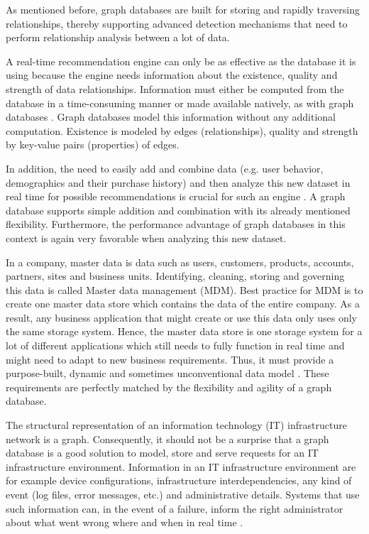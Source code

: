 As mentioned before, graph databases are built for storing and rapidly traversing relationships, thereby supporting advanced detection mechanisms that need to perform relationship analysis between a lot of data.


A real-time recommendation engine can only be as effective as the database it is using because the engine needs information about the existence, quality and strength of data relationships. Information must either be computed from the database in a time-consuming manner or made available natively, as with graph databases \autocite{neo4j:use_cases}. Graph databases model this information without any additional computation. Existence is modeled by edges (relationships), quality and strength by key-value pairs (properties) of edges.

In addition, the need to easily add and combine data (e.g. user behavior, demographics and their purchase history) and then analyze this new dataset in real time for possible recommendations is crucial for such an engine \autocite{neo4j:use_cases}. A graph database supports simple addition and combination with its already mentioned flexibility. Furthermore, the performance advantage of graph databases in this context is again very favorable when analyzing this new dataset.


In a company, master data is data such as users, customers, products, accounts, partners, sites and business units. Identifying, cleaning, storing and governing this data is called Master data management (MDM). Best practice for MDM is to create one master data store which contains the data of the entire company. As a result, any business application that might create or use this data only uses only the same storage system. Hence, the master data store is one storage system for a lot of different applications which still needs to fully function in real time and might need to adapt to new business requirements. Thus, it must provide a purpose-built, dynamic and sometimes unconventional data model \autocite{neo4j:use_cases}. These requirements are perfectly matched by the flexibility and agility of a graph database.


The structural representation of an information technology (IT) infrastructure network is a graph. Consequently, it should not be a surprise that a graph database is a good solution to model, store and serve requests for an IT infrastructure environment. Information in an IT infrastructure environment are for example device configurations, infrastructure interdependencies, any kind of event (log files, error messages, etc.) and administrative details. Systems that use such information can, in the event of a failure, inform the right administrator about what went wrong where and when in real time \autocite{neo4j:use_cases}.

